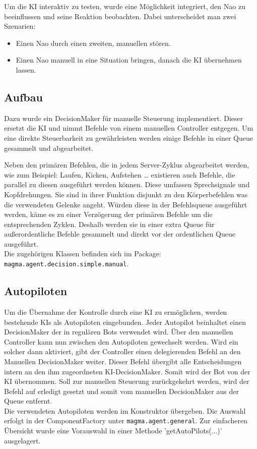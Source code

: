 Um die KI interaktiv zu testen, wurde eine Möglichkeit integriert, den Nao zu beeinflussen und seine Reaktion beobachten. Dabei unterscheidet man zwei Szenarien:
\begin{itemize}
\item Einen Nao durch einen zweiten, manuellen stören.
\item Einen Nao manuell in eine Situation bringen, danach die KI übernehmen lassen.
\end{itemize}

\subsection{Aufbau}
Dazu wurde ein DecisionMaker für manuelle Steuerung implementiert. Dieser ersetzt die KI und nimmt Befehle von einem manuellen Controller entgegen.
Um eine direkte Steuerbarkeit zu gewährleisten werden einige Befehle in einer Queue gesammelt und abgearbeitet.

Neben den primären Befehlen, die in jedem Server-Zyklus abgearbeitet werden, wie zum Beispiel: Laufen, Kicken, Aufstehen … existieren auch Befehle, die parallel zu diesen ausgeführt werden können. Diese umfassen Sprechsignale und Kopfdrehungen. Sie sind in ihrer Funktion disjunkt zu den Körperbefehlen was die verwendeten Gelenke angeht. Würden diese in der Befehlsqueue ausgeführt werden, käme es zu einer Verzögerung der primären Befehle um die entsprechenden Zyklen. Deshalb werden sie in einer extra Queue für außerordentliche Befehle gesammelt und direkt vor der ordentlichen Queue ausgeführt.\\
Die zugehörigen Klassen befinden sich im Package:\\ \texttt{magma.agent.decision.simple.manual}.

\subsection{Autopiloten}
Um die Übernahme der Kontrolle durch eine KI zu ermöglichen, werden bestehende KIs als Autopiloten eingebunden. Jeder Autopilot beinhaltet einen DecisionMaker der in regulären Bots verwendet wird. Über den manuellen Controller kann nun zwischen den Autopiloten gewechselt werden. Wird ein solcher dann aktiviert, gibt der Controller einen delegierenden Befehl an den Manuellen DecisionMaker weiter. Dieser Befehl übergibt alle Entscheidungen intern an den ihm zugeordneten KI-DecisionMaker. Somit wird der Bot von der KI übernommen. Soll zur manuellen Steuerung zurückgekehrt werden, wird der Befehl auf erledigt gesetzt und somit vom manuellen DecisionMaker aus der Queue entfernt.\\
Die verwendeten Autopiloten werden im Konstruktor übergeben. Die Auswahl erfolgt in der ComponentFactory unter \texttt{magma.agent.general}. Zur einfacheren Übersicht wurde eine Vorauswahl in einer Methode 'getAutoPilots(...)' ausgelagert.


